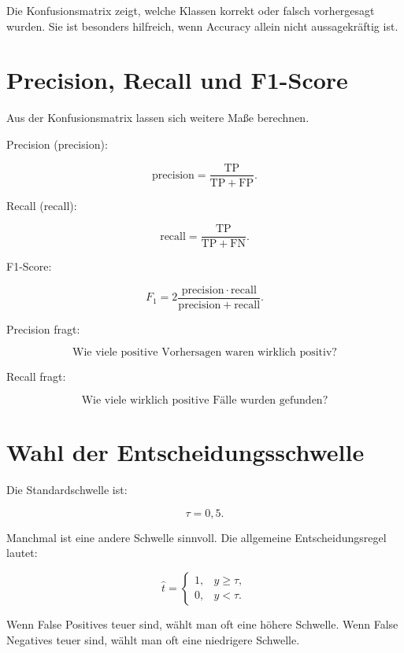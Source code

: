 \begin{definitionbox}
Die Konfusionsmatrix zeigt, welche Klassen korrekt oder falsch vorhergesagt wurden.
Sie ist besonders hilfreich, wenn Accuracy allein nicht aussagekräftig ist.
\end{definitionbox}

\section{Precision, Recall und F1-Score}

Aus der Konfusionsmatrix lassen sich weitere Maße berechnen.

Precision (precision):

\[
    \mathrm{precision}
    =
    \frac{\mathrm{TP}}{\mathrm{TP}+\mathrm{FP}}.
\]

Recall (recall):

\[
    \mathrm{recall}
    =
    \frac{\mathrm{TP}}{\mathrm{TP}+\mathrm{FN}}.
\]

F1-Score:

\[
    F_1
    =
    2
    \frac{
        \mathrm{precision}\cdot\mathrm{recall}
    }{
        \mathrm{precision}+\mathrm{recall}
    }.
\]

\begin{conceptbox}
Precision fragt:

\[
    \text{Wie viele positive Vorhersagen waren wirklich positiv?}
\]

Recall fragt:

\[
    \text{Wie viele wirklich positive Fälle wurden gefunden?}
\]
\end{conceptbox}

\section{Wahl der Entscheidungsschwelle}

Die Standardschwelle ist:

\[
    \tau=0{,}5.
\]

Manchmal ist eine andere Schwelle sinnvoll.
Die allgemeine Entscheidungsregel lautet:

\[
    \hat{t}
    =
    \begin{cases}
        1, & y \geq \tau, \\
        0, & y < \tau.
    \end{cases}
\]

Wenn False Positives teuer sind, wählt man oft eine höhere Schwelle.
Wenn False Negatives teuer sind, wählt man oft eine niedrigere Schwelle.

